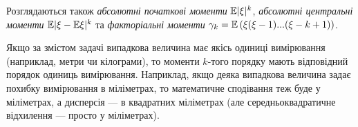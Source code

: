 Розглядаються також \emph{абсолютні початкові моменти} $\mathbb{E}\vert \xi \vert ^k$, 
\emph{абсолютні центральні моменти} $\mathbb{E}\vert \xi - \mathbb{E}\xi \vert ^k$
та \emph{факторіальні моменти} $\gamma_k = \mathbb{E}\left( \xi (\xi - 1) ... (\xi - k + 1)\right)$.
\begin{remark}
    Якщо за змістом задачі випадкова величина має якісь одиниці вимірювання (наприклад, метри чи кілограми),
    то моменти $k$-того порядку мають відповідний порядок одиниць вимірювання.
    Наприклад, якщо деяка випадкова величина задає похибку вимірювання в міліметрах,
    то математичне сподівання теж буде у міліметрах, а дисперсія --- в квадратних міліметрах
    (але середньоквадратичне відхилення --- просто у міліметрах).
\end{remark}


